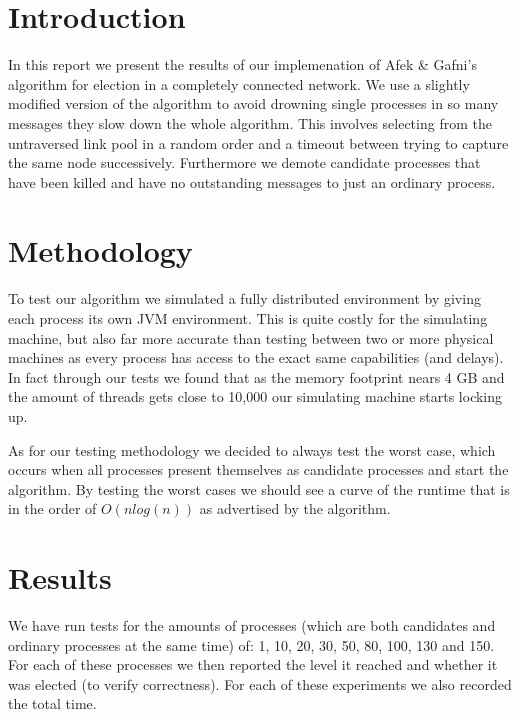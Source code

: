 \documentclass[12pt]{article}
\begin{document}
\setlength\headheight{0.8in}
\setlength\topmargin{-0.6in}
\setlength\textheight{9.0in}
\setlength\parindent{0pt}

\section{Introduction}
In this report we present the results of our implemenation of Afek \& Gafni's algorithm for election in a completely connected network.
We use a slightly modified version of the algorithm to avoid drowning single processes in so many messages they slow down the
whole algorithm. This involves selecting from the untraversed link pool in a random order and a timeout between trying to capture
the same node successively. Furthermore we demote candidate processes that have been killed and have no outstanding messages
to just an ordinary process.

\section{Methodology}
To test our algorithm we simulated a fully distributed environment by giving each process its own JVM environment.
This is quite costly for the simulating machine, but also far more accurate than testing between two or more
physical machines as every process has access to the exact same capabilities (and delays).
In fact through our tests we found that as the memory footprint nears 4 GB and the amount of threads gets close
to 10,000 our simulating machine starts locking up.

\quad As for our testing methodology we decided to always test the worst case, which occurs when all processes present themselves
as candidate processes and start the algorithm. By testing the worst cases we should see a curve of the runtime
that is in the order of $O(n log(n))$ as advertised by the algorithm.

\section{Results}
We have run tests for the amounts of processes (which are both candidates and ordinary processes at the same time) of:
1, 10, 20, 30, 50, 80, 100, 130 and 150. For each of these processes we then reported the level it reached and whether
it was elected (to verify correctness). For each of these experiments we also recorded the total time.
\end{document}

